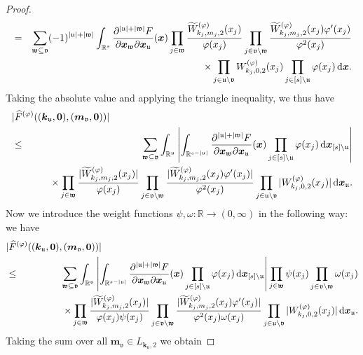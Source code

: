 \documentclass[namedate,webpdf,imanum]{ima-authoring-arxiv}%
\theoremstyle{thmstyletwo}%
\numberwithin{equation}{section}
\newcommand{\rd}{\, {\rm d}}
\newcommand{\bsx}{\boldsymbol{x}}
\newcommand{\bsk}{\boldsymbol{k}}
\newcommand{\bsm}{\boldsymbol{m}}
\newcommand{\bszero}{\boldsymbol{0}}
\newcommand{\uu}{\mathfrak{u}}
\newcommand{\vv}{\mathfrak{v}}
\newcommand{\ww}{\mathfrak{w}}
\newcommand{\RR}{\mathbb{R}}
\begin{document}
\begin{proof}
\begin{eqnarray*}
& = &\sum_{\ww \subseteq \vv}  (-1)^{|\uu| + |\ww|}  \int_{\mathbb{R}^s} \frac{\partial^{|\uu| + |\ww|} F}{\partial \bsx_\ww \partial \bsx_{\uu}}(\bsx) \prod_{j \in \ww} \frac{\widetilde{W}_{k_j,m_j,2}^{(\varphi)}(x_j)}{\varphi(x_j)} \prod_{j \in \vv \setminus \ww} \frac{\widetilde{W}_{k_j,m_j,2}^{(\varphi)}(x_j) \varphi'(x_j)}{\varphi^2(x_j)}  \\
& & \qquad \qquad \qquad \qquad \times \prod_{j \in \uu \setminus \vv} W^{(\varphi)}_{k_j, 0, 2}(x_j) \prod_{j \in [s]\setminus \uu} \varphi(x_j)  \rd \bsx.
\end{eqnarray*}
Taking the absolute value and applying the triangle inequality, we thus have
\begin{eqnarray*}
\lefteqn{|\widehat{F}^{(\varphi)}((\bsk_\uu,\bszero),(\bsm_\vv,\bszero))| }  \\
& \le & \sum_{\ww \subseteq \vv}    \int_{\mathbb{R}^{\uu}} \left| \int_{\mathbb{R}^{s-|\uu|}} \frac{\partial^{|\uu| + |\ww|} F}{\partial \bsx_\ww \partial \bsx_{\uu}}(\bsx)\prod_{j \in [s]\setminus \uu} \varphi(x_j) \rd \bsx_{[s] \setminus \uu} \right| \\
& &\qquad \times  \prod_{j \in \ww} \frac{|\widetilde{W}_{k_j,m_j,2}^{(\varphi)}(x_j)|}{\varphi(x_j)} \prod_{j \in \vv \setminus \ww} \frac{|\widetilde{W}_{k_j,m_j,2}^{(\varphi)}(x_j) \varphi'(x_j)|}{\varphi^2(x_j)}  \prod_{j \in \uu \setminus \vv} |W^{(\varphi)}_{k_j, 0, 2}(x_j)|   \rd \bsx_{\uu}.
\end{eqnarray*}
Now we introduce the weight functions $\psi,\omega:\RR \rightarrow (0,\infty)$ in the following way: we have
\begin{eqnarray*}
\lefteqn{| \widehat{F}^{(\varphi)}((\bsk_\uu,\bszero),(\bsm_\vv,\bszero)) | }  \\
& \le &\sum_{\ww \subseteq \vv}    \int_{\mathbb{R}^{\uu}} \left| \int_{\mathbb{R}^{s-|\uu|}} \frac{\partial^{|\uu| + |\ww|} F}{\partial \bsx_\ww \partial \bsx_{\uu}}(\bsx)\prod_{j \in [s]\setminus \uu} \varphi(x_j) \rd \bsx_{[s] \setminus \uu} \right|  \prod_{j \in \ww} \psi(x_j) \prod_{j \in \vv \setminus \ww} \omega(x_j)     \\
& & \qquad \qquad \times \prod_{j \in \ww} \frac{|\widetilde{W}_{k_j,m_j,2}^{(\varphi)}(x_j)|}{\varphi(x_j) \psi(x_j)} \prod_{j \in \vv \setminus \ww} \frac{|\widetilde{W}_{k_j,m_j,2}^{(\varphi)}(x_j) \varphi'(x_j)|}{\varphi^2(x_j) \omega(x_j)}  \prod_{j \in \uu \setminus \vv} |W^{(\varphi)}_{k_j, 0, 2}(x_j)| \rd \bsx_{\uu}.
\end{eqnarray*}
Taking the sum over all $\bsm_\vv \in L_{\bsk_\vv,2}$ we obtain

\end{proof}
\end{document}
